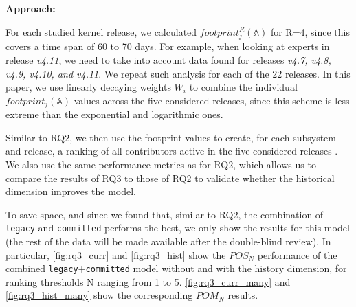 



{\bf Approach:}

For each studied kernel release, we calculated $footprint_j^R(\mathbb{A})$ for R=4, since this covers a time span of 60 to 70 days. For example, when looking at experts in release \textit{v4.11}, we need to take into account data found for releases \textit{v4.7, v4.8, v4.9, v4.10, and v4.11}. We repeat such analysis for each of the 22 releases. In this paper, we use linearly decaying weights $W_i$ to combine the individual $footprint_j(\mathbb{A})$ values across the five considered releases, since this scheme is less extreme than the exponential and logarithmic ones.

Similar to RQ2, we then use the footprint values to create, for each subsystem and release, a ranking of all contributors active in the five considered releases%
. We also use the same performance metrics as for RQ2, which allows us to compare the results of RQ3 to those of RQ2 to validate %
whether the historical dimension improves the model.

To save space, and since we found that, similar to RQ2, the combination of \texttt{legacy} and \texttt{committed} performs the best, we only show the results for this model (the rest of the data will be made available after the double-blind review). In particular, %
\autoref{fig:rq3_curr} and \autoref{fig:rq3_hist} show the $POS_N$ performance of the combined \texttt{legacy}+\texttt{committed} model without and with the history dimension, for ranking thresholds N ranging from 1 to 5. \autoref{fig:rq3_curr_many} and \autoref{fig:rq3_hist_many} show the corresponding $POM_N$ results.%

